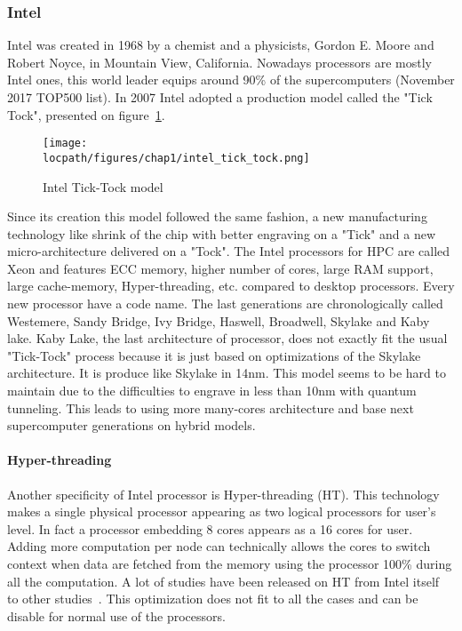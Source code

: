 \subsubsection{Intel}

Intel was created in 1968 by a chemist and a physicists, Gordon E. Moore and Robert Noyce, in Mountain View, California. 
Nowadays processors are mostly Intel ones, this world leader equips around 90\% of the supercomputers (November 2017 TOP500 list).
In 2007 Intel adopted a production model called the "Tick Tock", presented on figure~\ref{fig:1_HPC:intel_tick_tock}.

\begin{figure}[t!]
\begin{center}
\texttt{[image: \\locpath/figures/chap1/intel\_tick\_tock.png]}
\caption{Intel Tick-Tock model}
\label{fig:1_HPC:intel_tick_tock}
\end{center}
\end{figure}

Since its creation this model followed the same fashion, a new manufacturing technology like shrink of the chip with better engraving on a "Tick" and a new micro-architecture delivered on a "Tock".
The Intel processors for HPC are called Xeon and features ECC memory, higher number of cores, large RAM support, large cache-memory, Hyper-threading, etc. compared to desktop processors. 
Every new processor have a code name. 
The last generations are chronologically called Westemere, Sandy Bridge, Ivy Bridge, Haswell, Broadwell, Skylake and Kaby lake. 
Kaby Lake, the last architecture of processor, does not exactly fit the usual "Tick-Tock" process because it is just based on optimizations of the Skylake architecture. 
It is produce like Skylake in 14nm.
This model seems to be hard to maintain due to the difficulties to engrave in less than 10nm with quantum tunneling. 
This leads to using more many-cores architecture and base next supercomputer generations on hybrid models. 

\paragraph{Hyper-threading}
Another specificity of Intel processor is Hyper-threading (HT). 
This technology makes a single physical processor appearing as two logical processors for user's level.
In fact a processor embedding 8 cores appears as a 16 cores for user. 
Adding more computation per node can technically allows the cores to switch context when data are fetched from the memory using the processor 100\% during all the computation. 
A lot of studies have been released on HT from Intel itself~\cite{marr2002hyperthreading} to other studies~\cite{bononi2006exploring,leng2002empirical}.
This optimization does not fit to all the cases and can be disable for normal use of the processors. 

